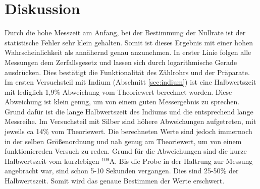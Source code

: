\section{Diskussion}
\label{sec:Diskussion}
Durch die hohe Messzeit am Anfang, bei der Bestimmung der Nullrate ist der statistische Fehler sehr klein gehalten.
Somit ist dieses Ergebnis mit einer hohen Wahrscheinlichkeit als annähernd genau anzunehmen.
In erster Linie folgen alle Messungen dem Zerfallsgesetz und lassen sich durch logarithmische Gerade ausdrücken.
Dies bestätigt die Funktionalität des Zählrohrs und der Präparate.
Im ersten Versuchsteil mit Indium (Abschnitt \ref{sec:indium}) ist eine Halbwertszeit mit lediglich 1,9\% Abweichung vom Theoriewert berechnet worden.
Diese Abweichung ist klein genug, um von einem guten Messergebnis zu sprechen.
Grund dafür ist die lange Halbwertszeit des Indiums und die entsprechend lange Messreihe.
Im Versuchsteil mit Silber sind höhere Abweichungen aufgetreten, mit jeweils ca 14\% vom Theoriewert.
Die berechneten Werte sind jedoch immernoch in der selben Größenordnung und nah genug am Theoriewert, um von einem funktioniereden Versuch zu reden.
Grund für die Abweichungen sind die kurze Halbwertszeit vom kurzlebigen $^{109}$A.
Bis die Probe in der Haltrung zur Messung angebracht war, sind schon 5-10 Sekunden vergangen.
Dies sind 25-50\% der Halbwertszeit.
Somit wird das genaue Bestimmen der Werte erschwert.